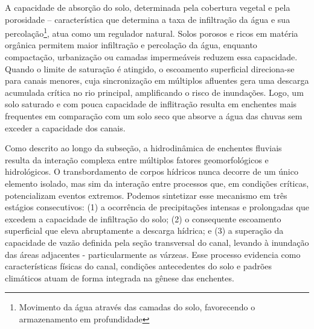 A capacidade de absorção do solo, determinada pela cobertura vegetal e pela porosidade – característica que determina a
taxa de infiltração da água e sua percolação\footnote{Movimento da água através das camadas do solo, favorecendo o
armazenamento em profundidade}, atua como um regulador natural. Solos porosos e ricos em matéria orgânica permitem maior
infiltração e percolação da água, enquanto compactação, urbanização ou camadas impermeáveis reduzem essa capacidade.
Quando o limite de saturação é atingido, o escoamento superficial direciona-se para canais menores, cuja sincronização
em múltiplos afluentes gera uma descarga acumulada crítica no rio principal, amplificando o risco de inundações. Logo,
um solo saturado e com pouca capacidade de inflitração resulta em enchentes mais frequentes em comparação com um solo
seco que absorve a água das chuvas sem exceder a capacidade dos canais.

Como descrito ao longo da subseção, a hidrodinâmica de enchentes fluviais resulta da interação complexa entre múltiplos
fatores geomorfológicos e hidrológicos. O transbordamento de corpos hídricos nunca decorre de um único elemento isolado,
mas sim da interação entre processos que, em condições críticas, potencializam eventos extremos. Podemos sintetizar esse
mecanismo em três estágios consecutivos: (1) a ocorrência de precipitações intensas e prolongadas que excedem a
capacidade de infiltração do solo; (2) o consequente escoamento superficial que eleva abruptamente a descarga hídrica; e
(3) a superação da capacidade de vazão definida pela seção transversal do canal, levando à inundação das áreas
adjacentes - particularmente as várzeas. Esse processo evidencia como características físicas do canal, condições
antecedentes do solo e padrões climáticos atuam de forma integrada na gênese das enchentes.


